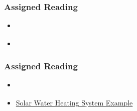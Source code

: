 \documentclass[t,12pt,numbers,fleqn]{beamer}
\begin{document}
\begin{frame}
\frametitle{Assigned Reading}

\begin {itemize}

\item
  \href{https://gitlab.cas.mcmaster.ca/smiths/cas741/blob/master/ReferenceMaterial/SoftEngForScienceBook.pdf}
  {}
\item
  \href{https://gitlab.cas.mcmaster.ca/smiths/cas741/blob/master/ReferenceMaterial/SmithLaiAndKhedri2007fulltext.pdf}
  {}
\end{itemize}

\end{frame}


\begin{frame}
\frametitle{Assigned Reading}

\begin {itemize}

\item
  \href{https://gitlab.cas.mcmaster.ca/smiths/cas741/blob/master/ReferenceMaterial/ParnasAndClements1986.pdf}
  {}
\item \href{https://github.com/smiths/swhs}{Solar Water Heating System Example}
\end{itemize}

\end{frame}

\end{document}
